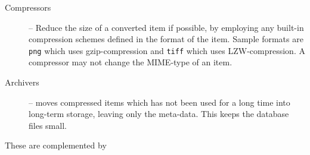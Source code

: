 \begin{description}

\item[Compressors] -- Reduce the size of a converted item if
  possible, by employing any built-in compression schemes
  defined in the format of the item.  Sample formats are
  \texttt{png} which uses gzip-compression and \texttt{tiff}
  which uses LZW-compression.  A compressor may not change
  the MIME-type of an item.



\item[Archivers] -- moves compressed items which has not
  been used for a long time into long-term storage, leaving
  only the meta-data.  This keeps the database files small.



\end{description}

These are complemented by

